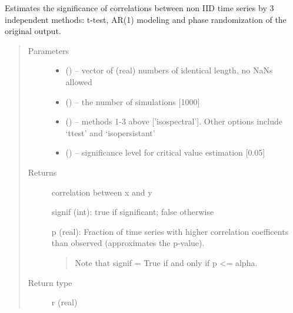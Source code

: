 \documentclass[letterpaper,10pt,english]{sphinxmanual}
\begin{document}
\begin{fulllineitems}
\label{\detokenize{Stats:pyleoclim.Stats.corrsig}}
Estimates the significance of correlations between non IID time series by 3 independent methods:
t-test, AR(1) modeling and phase randomization of the original output.
\begin{quote}\begin{description}
\item[{Parameters}] \leavevmode\begin{itemize}
\item {} 
 (\sphinxstyleliteralemphasis{,}\sphinxstyleliteralemphasis{}) -- vector of (real) numbers of identical length, no NaNs allowed

\item {} 
 () -- the number of simulations {[}1000{]}

\item {} 
 () -- methods 1-3 above {[}'isospectral'{]}. Other options include `ttest'
and `isopersistant'

\item {} 
 () -- significance level for critical value estimation {[}0.05{]}

\end{itemize}

\item[{Returns}] \leavevmode

correlation between x and y

signif (int): true  if significant; false otherwise

p (real): Fraction of time series with higher correlation coefficents than observed (approximates the p-value).
\begin{quote}

Note that signif = True if and only if p \textless{}= alpha.
\end{quote}


\item[{Return type}] \leavevmode
r (real)

\end{description}\end{quote}

\end{fulllineitems}
\end{document}
